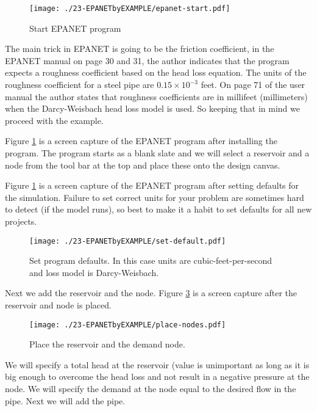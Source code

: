 \begin{figure}[htbp] %
   \centering
   \texttt{[image: ./23-EPANETbyEXAMPLE/epanet-start.pdf]} 
   \caption{Start EPANET program}
   \label{fig:epanet-start}
\end{figure}
The main trick in EPANET is going to be the friction coefficient, in the EPANET manual on page 30 and 31, the author indicates that the program expects a roughness coefficient based on the head loss equation.  The units of the roughness coefficient for a steel pipe are $0.15 \times 10^{-3}$ feet.   On page 71 of the user manual the author states that roughness coefficients are in millifeet (millimeters) when the Darcy-Weisbach head loss model is used.   So keeping that in mind we proceed with the example.

Figure \ref{fig:epanet-start} is a screen capture of the EPANET program after installing the program.   The program starts as a blank slate and we will select a reservoir and a node from the tool bar at the top and place these onto the design canvas.

Figure \ref{fig:epanet-start} is a screen capture of the EPANET program after setting defaults for the simulation.   Failure to set correct units for your problem are sometimes hard to detect (if the model runs), so best to make it a habit to set defaults for all new projects.
\begin{figure}[htbp] %
   \centering
   \texttt{[image: ./23-EPANETbyEXAMPLE/set-default.pdf]} 
   \caption{Set program defaults.  In this case units are cubic-feet-per-second and loss model is Darcy-Weisbach.}
   \label{fig:set-default}
\end{figure}
Next we add the reservoir and the node.   Figure \ref{fig:place-nodes} is a screen capture after the reservoir and node is placed.
\begin{figure}[htbp] %
   \centering
   \texttt{[image: ./23-EPANETbyEXAMPLE/place-nodes.pdf]} 
   \caption{Place the reservoir and the demand node.}
   \label{fig:place-nodes}
\end{figure}
We will specify a total head at the reservoir (value is unimportant as long as it is big enough to overcome the head loss and not result in a negative pressure at the node.   We will specify the demand at the node equal to the desired flow in the pipe.     Next we will add the pipe.

